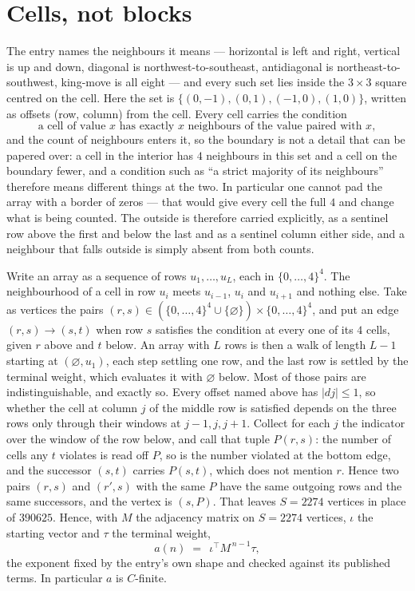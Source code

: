 \documentclass[11pt,a4paper]{article}
\theoremstyle{plain}
\theoremstyle{definition}
\begin{document}
\section{Cells, not blocks}

The entry names the neighbours it means --- horizontal is left and right, vertical is up and
down, diagonal is northwest-to-southeast, antidiagonal is northeast-to-southwest, king-move is
all eight --- and every such set lies inside the $3\times3$ square centred on the cell. Here
the set is $\{(0,-1), (0,1), (-1,0), (1,0)\}$, written as offsets (row, column) from the cell. Every cell carries
the condition
\[
\text{a cell of value }x\text{ has exactly }x\text{ neighbours of the value paired with }x,
\]
and the count of neighbours enters it, so the boundary is not a detail that can be papered
over: a cell in the interior has $4$ neighbours in this set and a cell on the boundary
fewer, and a condition such as ``a strict majority of its neighbours'' therefore means
different things at the two. In particular one cannot pad the array with a border of zeros ---
that would give every cell the full $4$ and change what is being counted. The outside is
therefore carried
explicitly, as a sentinel row above the first and below the last and as a sentinel column
either side, and a neighbour that falls outside is simply absent from both counts.

Write an array as a sequence of rows $u_1,\dots,u_L$, each in
$\{0,\dots,4\}^{4}$. The neighbourhood of a cell in row $u_i$ meets $u_{i-1}$,
$u_i$ and $u_{i+1}$ and nothing else. Take as vertices the pairs
$(r,s)\in(\{0,\dots,4\}^{4}\cup\{\varnothing\})\times\{0,\dots,4\}^{4}$,
and put an edge $(r,s)\to(s,t)$ when row $s$ satisfies the condition at every one of its
$4$ cells, given $r$ above and $t$ below. An array with $L$ rows is then a walk of length
$L-1$ starting at $(\varnothing,u_1)$, each step settling one row, and the last row is
settled by the terminal weight, which evaluates it with $\varnothing$ below. Most of those pairs are indistinguishable, and exactly so. Every offset named above has $|dj|\le 1$, so whether the cell at column $j$ of the middle row is satisfied depends on the three rows only through their windows at $j-1,j,j+1$. Collect for each $j$ the indicator over the window of the row below, and call that tuple $P(r,s)$: the number of cells any $t$ violates is read off $P$, so is the number violated at the bottom edge, and the successor $(s,t)$ carries $P(s,t)$, which does not mention $r$. Hence two pairs $(r,s)$ and $(r',s)$ with the same $P$ have the same outgoing rows and the same successors, and the vertex is $(s,P)$. That leaves $S=2274$ vertices in place of $390625$. Hence,
with $M$ the adjacency matrix on $S=2274$ vertices, $\iota$ the starting vector and $\tau$ the
terminal weight,
\[
a(n)\;=\;\,\iota^{\!\top}M^{\,n-1}\tau ,
\]
the exponent fixed by the entry's own shape and checked against its published terms. In
particular $a$ is $C$-finite.
\end{document}
